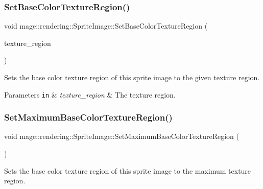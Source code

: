 \subsubsection{\texorpdfstring{Set\+Base\+Color\+Texture\+Region()}{SetBaseColorTextureRegion()}}
{\footnotesize\ttfamily void mage\+::rendering\+::\+Sprite\+Image\+::\+Set\+Base\+Color\+Texture\+Region (\begin{DoxyParamCaption}\item[{R\+E\+CT}]{texture\+\_\+region }\end{DoxyParamCaption})\hspace{0.3cm}{\ttfamily [noexcept]}}

Sets the base color texture region of this sprite image to the given texture region.


\begin{DoxyParams}[1]{Parameters}
\mbox{\tt in}  & {\em texture\+\_\+region} & The texture region. \\
\hline
\end{DoxyParams}
\mbox{\label{classmage_1_1rendering_1_1_sprite_image_a5b0a8abc53768cce82c3c2f8f1a96745}} 
\subsubsection{\texorpdfstring{Set\+Maximum\+Base\+Color\+Texture\+Region()}{SetMaximumBaseColorTextureRegion()}}
{\footnotesize\ttfamily void mage\+::rendering\+::\+Sprite\+Image\+::\+Set\+Maximum\+Base\+Color\+Texture\+Region (\begin{DoxyParamCaption}{ }\end{DoxyParamCaption})\hspace{0.3cm}{\ttfamily [noexcept]}}

Sets the base color texture region of this sprite image to the maximum texture region. \mbox{\label{classmage_1_1rendering_1_1_sprite_image_a504ebb2cdc216d26bdbcb24cfa5466d4}} 
